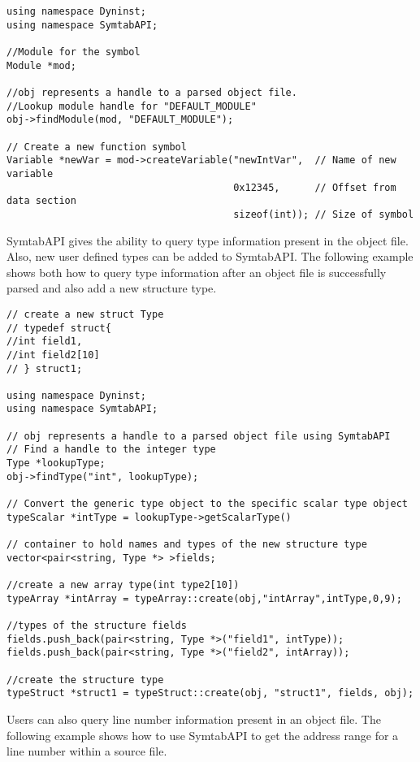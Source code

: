 \begin{lstlisting}
using namespace Dyninst;
using namespace SymtabAPI;

//Module for the symbol
Module *mod;

//obj represents a handle to a parsed object file.
//Lookup module handle for "DEFAULT_MODULE" 
obj->findModule(mod, "DEFAULT_MODULE");

// Create a new function symbol
Variable *newVar = mod->createVariable("newIntVar",  // Name of new variable
                                       0x12345,      // Offset from data section
                                       sizeof(int)); // Size of symbol 
\end{lstlisting}

SymtabAPI gives the ability to query type information present in the object file. Also, new user defined types can be added to SymtabAPI. The following example shows both how to query type information after an object file is successfully parsed and also add a new structure type.

\begin{lstlisting}
// create a new struct Type
// typedef struct{
//int field1,
//int field2[10]
// } struct1;

using namespace Dyninst;
using namespace SymtabAPI;

// obj represents a handle to a parsed object file using SymtabAPI
// Find a handle to the integer type
Type *lookupType;
obj->findType("int", lookupType);

// Convert the generic type object to the specific scalar type object
typeScalar *intType = lookupType->getScalarType()

// container to hold names and types of the new structure type
vector<pair<string, Type *> >fields;

//create a new array type(int type2[10])
typeArray *intArray = typeArray::create(obj,"intArray",intType,0,9);

//types of the structure fields
fields.push_back(pair<string, Type *>("field1", intType));
fields.push_back(pair<string, Type *>("field2", intArray));

//create the structure type
typeStruct *struct1 = typeStruct::create(obj, "struct1", fields, obj);
\end{lstlisting}

Users can also query line number information present in an object file. The following example shows how to use SymtabAPI to get the address range for a line number within a source file.

